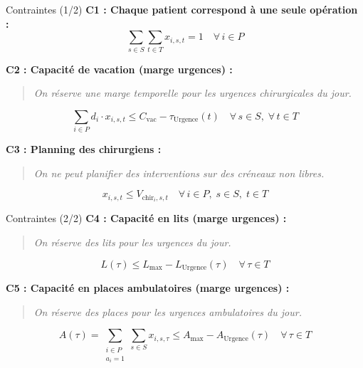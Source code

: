 \begin{frame}{Contraintes (1/2)}
  \small
  \textbf{C1 : Chaque patient correspond à une seule opération :}
  $$\sum_{s \in S} \sum_{t \in T} x_{i,s,t} = 1 \quad \forall\, i \in P$$

  \vspace{0.3em}
  \textbf{C2 : Capacité de vacation (marge urgences) :}
  \begin{quote}
    \small\textit{On réserve une marge temporelle pour les urgences chirurgicales du jour.}
  \end{quote}
  $$\sum_{i \in P} d_i \cdot x_{i,s,t} \leq C_{\text{vac}} - \tau_{\text{Urgence}}(t) \quad \forall\, s \in S,\; \forall\, t \in T$$

  \vspace{0.3em}
  \textbf{C3 : Planning des chirurgiens :}
  \begin{quote}
    \small\textit{On ne peut planifier des interventions sur des créneaux non libres.}
  \end{quote}
  $$x_{i,s,t} \leq V_{\text{chir}_i, s, t} \quad \forall\, i \in P,\; s \in S,\; t \in T$$
\end{frame}

\begin{frame}{Contraintes (2/2)}
  \small
  \textbf{C4 : Capacité en lits (marge urgences) :}
  \begin{quote}
    \small\textit{On réserve des lits pour les urgences du jour.}
  \end{quote}
  $$L(\tau) \leq L_{\max} - L_{\text{Urgence}}(\tau) \quad \forall\, \tau \in T$$

  \vspace{0.8em}
  \textbf{C5 : Capacité en places ambulatoires (marge urgences) :}
  \begin{quote}
    \small\textit{On réserve des places pour les urgences ambulatoires du jour.}
  \end{quote}
  $$A(\tau) = \!\!\!\sum_{\substack{i \in P \\ a_i = 1}} \sum_{s \in S} x_{i,s,\tau} \leq A_{\max} - A_{\text{Urgence}}(\tau) \quad \forall\, \tau \in T$$
\end{frame}

